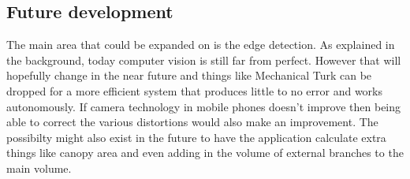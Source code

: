 \subsection{Future development}
The main area that could be expanded on is the edge detection. As explained in the background, today computer vision is still far from perfect. However that will hopefully change in the near future and things like Mechanical Turk can be dropped for a more efficient system that produces little to no error and works autonomously. If camera technology in mobile phones doesn't improve then being able to correct the various distortions would also make an improvement. The possibilty might also exist in the future to have the application calculate extra things like canopy area and even adding in the volume of external branches to the main volume. 

